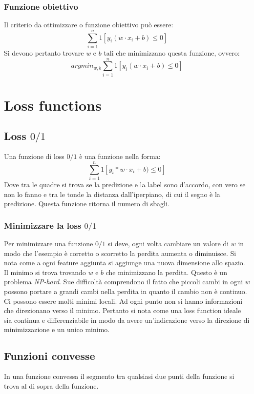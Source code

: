		\subsubsection{Funzione obiettivo}
		Il criterio da ottimizzare o funzione obiettivo pu\`o essere:
		$$\sum\limits_{i=1}^n1[y_i(w\cdot x_i+b)\le 0]$$
		Si devono pertanto trovare $w$ e $b$ tali che minimizzano questa funzione, ovvero:
		$$argmin_{w,b}\sum\limits_{i=1}^n1[y_i(w\cdot x_i+b)\le 0]$$

\section{Loss functions}

	\subsection{Loss $0/1$}
	Una funzione di loss $0/1$ \`e una funzione nella forma:
	$$\sum\limits_{i=1}^n1[y_i*w\cdot x_i+b)\le 0]$$
	Dove tra le quadre si trova se la predizione e la label sono d'accordo, con vero se non lo fanno e tra le tonde la distanza dall'iperpiano, di cui il segno \`e la predizione.
	Questa funzione ritorna il numero di sbagli.

		\subsubsection{Minimizzare la loss $0/1$}
		Per minimizzare una funzione $0/1$ si deve, ogni volta cambiare un valore di $w$ in modo che l'esempio \`e corretto o scorretto la perdita aumenta o diminuisce.
		Si nota come a ogni feature aggiunta si aggiunge una nuova dimensione allo spazio.
		Il minimo si trova trovando $w$ e $b$ che minimizzano la perdita.
		Questo \`e un problema \emph{NP-hard}.
		Sue difficolt\`a comprendono il fatto che piccoli cambi in ogni $w$ possono portare a grandi cambi nella perdita in quanto il cambio non \`e continuo.
		Ci possono essere molti minimi locali.
		Ad ogni punto non si hanno informazioni che direzionano verso il minimo.
		Pertanto si nota come una loss function ideale sia continua e differenziabile in modo da avere un'indicazione verso la direzione di minimizzazione e un unico minimo.

	\subsection{Funzioni convesse}
	In una funzione convessa il segmento tra qualsiasi due punti della funzione si trova al di sopra della funzione.

